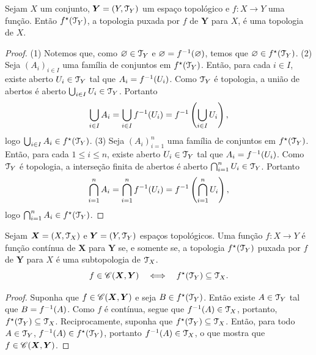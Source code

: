 \begin{prop}
Sejam $X$ um conjunto, $\bm Y = (Y,\mathcal{T}_Y)$ um espaço topológico e $f: X \to Y$ uma função. Então $f^\star(\mathcal{T}_Y)$, a topologia puxada por $f$ de $\bm Y$ para $X$, é uma topologia de $X$.
\end{prop}
\begin{proof}
(1) Notemos que, como $\varnothing \in \mathcal{T}_Y$ e $\varnothing = f^{-1}(\varnothing)$, temos que $\varnothing \in f^\star(\mathcal{T}_Y)$. (2) Seja $(A_i)_{i \in I}$ uma família de conjuntos em $f^\star(\mathcal{T}_Y)$. Então, para cada $i \in I$, existe aberto $U_i \in \mathcal{T}_Y$ tal que $A_i=f^{-1}(U_i)$. Como $\mathcal{T}_Y$ é topologia, a união de abertos é aberto $\bigcup_{i \in I} U_i \in \mathcal{T}_Y$. Portanto
	\begin{equation*}
	\bigcup_{i \in I} A_i = \bigcup_{i \in I} f^{-1}(U_i) = f^{-1}\left( \bigcup_{i \in I} U_i\right),
	\end{equation*}
logo $\bigcup_{i \in I} A_i \in f^\star(\mathcal{T}_Y)$.
(3) Seja $(A_i)_{i=1}^n$ uma família de conjuntos em $f^\star(\mathcal{T}_Y)$. Então, para cada $1 \leq i \leq n$, existe aberto $U_i \in \mathcal{T}_Y$ tal que $A_i=f^{-1}(U_i)$. Como $\mathcal{T}_Y$ é topologia, a interseção finita de abertos é aberto $\bigcap_{i=1}^n U_i \in \mathcal{T}_Y$. Portanto
	\begin{equation*}
	\bigcap_{i=1}^n A_i = \bigcap_{i=1}^n f^{-1}(U_i) = f^{-1}\left( \bigcap_{i=1}^n U_i\right),
	\end{equation*}
logo $\bigcap_{i=1}^n A_i \in f^\star(\mathcal{T}_Y)$.
\end{proof}

\begin{prop}
\label{topo:prop.cont.topo.pux}
Sejam $\bm X = (X,\mathcal{T}_ X)$ e $\bm Y = (Y,\mathcal{T}_ Y)$ espaços topológicos. Uma função $f: X \to Y$ é função contínua de $\bm X$ para $\bm Y$ se, e somente se, a topologia $f^\star(\mathcal{T}_Y)$ puxada por $f$ de $\bm Y$ para $X$ é uma subtopologia de $\mathcal{T}_ X$.
	\begin{equation*}
	f \in \mathscr{C}(\bm X,\bm Y) \quad \Longleftrightarrow \quad f^\star(\mathcal{T}_Y) \subseteq \mathcal{T}_X.
	\end{equation*}
\end{prop}
\begin{proof}
Suponha que $f \in \mathscr{C}(\bm X,\bm Y)$ e seja $B \in f^\star(\mathcal{T}_Y)$. Então existe $A \in \mathcal{T}_Y$ tal que $B=f^{-1}(A)$. Como $f$ é contínua, segue que $f^{-1}(A) \in \mathcal{T}_X$, portanto, $f^\star(\mathcal{T}_Y) \subseteq \mathcal{T}_X$. Reciprocamente, suponha que $f^\star(\mathcal{T}_Y) \subseteq \mathcal{T}_X$. Então, para todo $A \in \mathcal{T}_Y$, $f^{-1}(A) \in f^\star(\mathcal{T}_Y)$, portanto $f^{-1}(A) \in \mathcal{T}_X$, o que mostra que $f \in \mathscr{C}(\bm X,\bm Y)$.
\end{proof}

